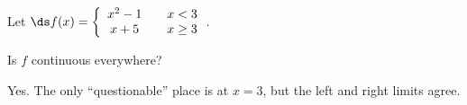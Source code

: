 {Let $\ds f(x) = \left\{ \begin{array}{ccc} x^2-1 & & x < 3 \\
																						x+5 & & x\geq 3 
													\end{array}\right.$.
													
Is $f$ continuous everywhere?
}
{Yes. The only ``questionable'' place is at $x=3$, but the left and right limits agree.}
